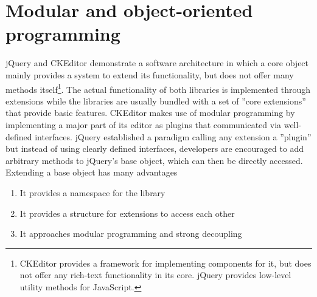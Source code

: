 



\section{Modular and object-oriented programming}
\label{subsec:modular_and_oop}

jQuery and CKEditor demonstrate a software architecture in which a core object mainly provides a system to extend its functionality, but does not offer many methods itself\footnote{CKEditor provides a framework for implementing components for it, but does not offer any rich-text functionality in its core. jQuery provides low-level utility methods for JavaScript.}. The actual functionality of both libraries is implemented through extensions while the libraries are usually bundled with a set of ''core extensions'' that provide basic features. CKEditor makes use of modular programming by implementing a major part of its editor as plugins that communicated via well-defined interfaces. jQuery established a paradigm calling any extension a ''plugin'' but instead of using clearly defined interfaces, developers are encouraged to add arbitrary methods to jQuery's base object, which can then be directly accessed. Extending a base object has many advantages

\begin{enumerate}
\item It provides a namespace for the library
\item It provides a structure for extensions to access each other
\item It approaches modular programming and strong decoupling
\end{enumerate}


